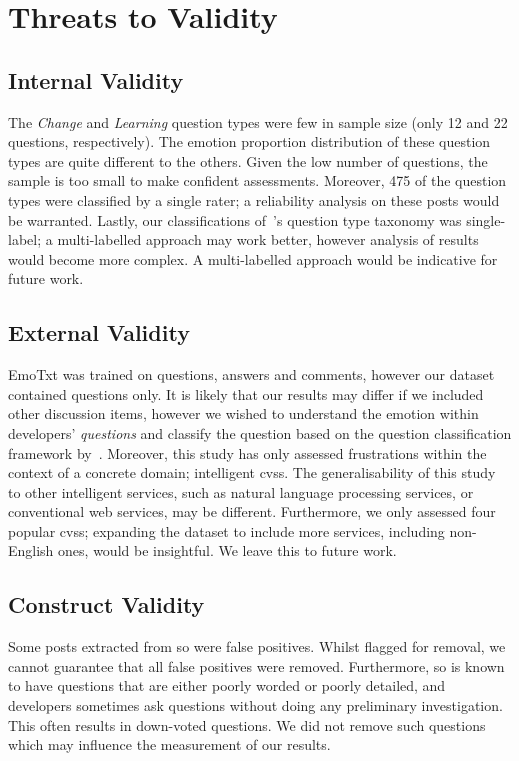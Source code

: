 \section{Threats to Validity}\label{semotion2021:sec:threats}

\subsection{Internal Validity} The \textit{ Change} and \textit{Learning} question types were few in sample size (only 12 and 22 questions, respectively). The emotion  proportion distribution of these question types are  quite different to the others.  Given the low number of questions, the sample is too small to make confident assessments. Moreover, 475 of the question types were classified by a single rater; a reliability analysis on these posts would be warranted. Lastly, our classifications of~\citeauthor{Beyer:2018fm}'s question type taxonomy was single-label; a multi-labelled approach may work better, however analysis of results would become more complex. A multi-labelled approach would be indicative for future work.

\subsection{External Validity} EmoTxt was trained on questions, answers and comments, however our dataset contained questions only. It is likely that our results may differ if we included other discussion items, however we wished to understand the emotion within developers' \textit{questions} and classify the question based on the question classification framework by~\citet{Beyer:2018fm}. Moreover, this study has only assessed frustrations within the context of a concrete domain; intelligent \glspl{cvs}. The generalisability of this study to other intelligent services, such as natural language processing services, or conventional web services, may be different. Furthermore, we only assessed four popular \glspl{cvs}; expanding the dataset to include more services, including non-English ones, would be insightful. We leave this to future work.

\subsection{Construct Validity} Some posts extracted from \gls{so} were false positives. Whilst flagged for removal, we cannot guarantee that all false positives were removed. Furthermore, \gls{so} is known to have questions that are either poorly worded or poorly detailed, and developers sometimes ask questions without doing any preliminary investigation. This often results in down-voted questions. We did not remove such questions which may influence the measurement of our results.

